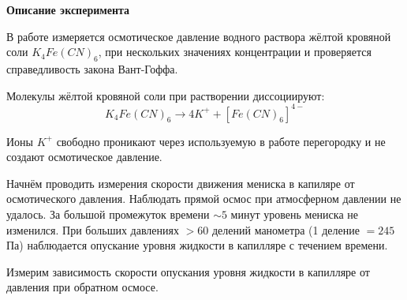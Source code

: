 \textbf{\Large Описание эксперимента}

В работе измеряется осмотическое давление водного раствора жёлтой кровяной соли $K_4 Fe (CN)_6$, при нескольких значениях концентрации и проверяется справедливость закона Вант-Гоффа.

Молекулы жёлтой кровяной соли при растворении диссоциируют:
$$
K_4 Fe (CN)_6 \rightarrow 4 K^+ + [Fe (CN)_6]^{4-}
$$

Ионы $K^+$ свободно проникают через используемую в работе перегородку и не создают осмотическое давление.

Начнём проводить измерения скорости движения мениска в капиляре от осмотического давления. Наблюдать прямой осмос при атмосферном давлении не удалось. За большой промежуток времени $\sim 5$ минут уровень мениска не изменился. При больших давлениях $>60$ делений манометра (1 деление $ = 245$ Па) наблюдается опускание уровня жидкости в капилляре с течением времени.

Измерим зависимость скорости опускания уровня жидкости в капилляре от давления при обратном осмосе.



\newpage

